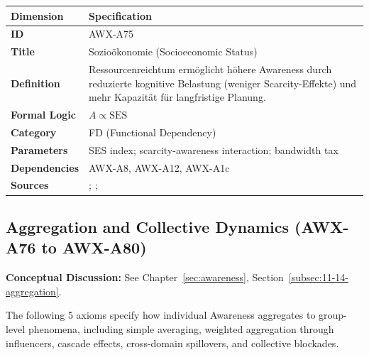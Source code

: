 \begin{table}[htbp]
\small
\begin{tabular}{p{3cm}p{11cm}}
\toprule
\textbf{Dimension} & \textbf{Specification} \\
\midrule
\textbf{ID} & AWX-A75 \\
\textbf{Title} & Sozioökonomie (Socioeconomic Status) \\
\textbf{Definition} & Ressourcenreichtum ermöglicht höhere Awareness durch reduzierte kognitive Belastung (weniger Scarcity-Effekte) und mehr Kapazität für langfristige Planung. \\
\textbf{Formal Logic} & $A \propto \text{SES}$ \\
\textbf{Category} & FD (Functional Dependency) \\
\textbf{Parameters} & SES index; scarcity-awareness interaction; bandwidth tax \\
\textbf{Dependencies} & AWX-A8, AWX-A12, AWX-A1c \\
\textbf{Sources} & \citet{mani2013poverty}; \citet{mullainathan2013scarcity}; \citet{haushofer2014psychology} \\
\bottomrule
\end{tabular}
\end{table}




\subsection{Aggregation and Collective Dynamics (AWX-A76 to AWX-A80)}

\begin{cross-reference}
\textbf{Conceptual Discussion:} See Chapter~\ref{sec:awareness}, Section~\ref{subsec:11-14-aggregation}.
\end{cross-reference}
The following 5 axioms specify how individual Awareness aggregates to group-level phenomena, including simple averaging, weighted aggregation through influencers, cascade effects, cross-domain spillovers, and collective blockades.


